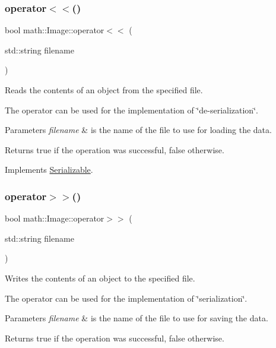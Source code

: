\subsubsection{\texorpdfstring{operator$<$$<$()}{operator<<()}}
{\footnotesize\ttfamily bool math\+::\+Image\+::operator$<$$<$ (\begin{DoxyParamCaption}\item[{std\+::string}]{filename }\end{DoxyParamCaption})\hspace{0.3cm}{\ttfamily [virtual]}}

Reads the contents of an object from the specified file.

The operator can be used for the implementation of \char`\"{}de-\/serialization\char`\"{}.


\begin{DoxyParams}{Parameters}
{\em filename} & is the name of the file to use for loading the data.\\
\hline
\end{DoxyParams}
\begin{DoxyReturn}{Returns}
true if the operation was successful, false otherwise. 
\end{DoxyReturn}


Implements \hyperlink{class_serializable_a5a8ec3fd8411693715ac76b1a10386ba}{Serializable}.

\mbox{\label{classmath_1_1_image_a5a48aa778e407699272463a1be8ac16f}} 
\subsubsection{\texorpdfstring{operator$>$$>$()}{operator>>()}}
{\footnotesize\ttfamily bool math\+::\+Image\+::operator$>$$>$ (\begin{DoxyParamCaption}\item[{std\+::string}]{filename }\end{DoxyParamCaption})\hspace{0.3cm}{\ttfamily [virtual]}}

Writes the contents of an object to the specified file.

The operator can be used for the implementation of \char`\"{}serialization\char`\"{}.


\begin{DoxyParams}{Parameters}
{\em filename} & is the name of the file to use for saving the data.\\
\hline
\end{DoxyParams}
\begin{DoxyReturn}{Returns}
true if the operation was successful, false otherwise. 
\end{DoxyReturn}


